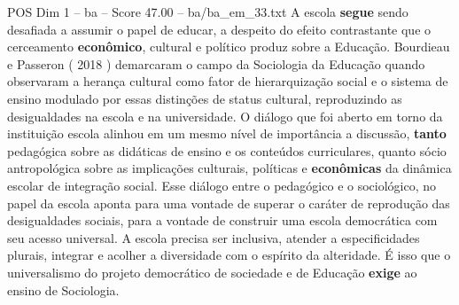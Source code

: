\begin{textsample}{POS Dim 1 – ba – Score 47.00 – ba/ba\_em\_33.txt}
A escola \textbf{segue} sendo desafiada a assumir o papel de educar, a despeito do efeito contrastante que o cerceamento \textbf{econômico}, cultural e político produz sobre a Educação.
Bourdieau e Passeron ( 2018 ) demarcaram o campo da Sociologia da Educação quando observaram a herança cultural como fator de hierarquização social e o sistema de ensino modulado por essas distinções de status cultural, reproduzindo as desigualdades na escola e na universidade.
O diálogo que foi aberto em torno da instituição escola alinhou em um mesmo nível de importância a discussão, \textbf{tanto} pedagógica sobre as didáticas de ensino e os conteúdos curriculares, quanto sócio antropológica sobre as implicações culturais, políticas e \textbf{econômicas} da dinâmica escolar de integração social.
Esse diálogo entre o pedagógico e o sociológico, no papel da escola aponta para uma vontade de superar o caráter de reprodução das desigualdades sociais, para a vontade de construir uma escola democrática com seu acesso universal.
A escola precisa ser inclusiva, atender a especificidades plurais, integrar e acolher a diversidade com o espírito da alteridade.
É isso que o universalismo do projeto democrático de sociedade e de Educação \textbf{exige} ao ensino de Sociologia.

\end{textsample}
